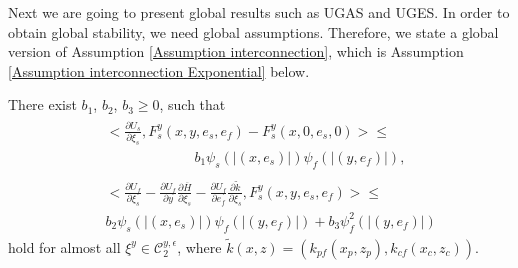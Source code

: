 Next we are going to present global results such as UGAS and UGES. 
In order to obtain global stability, we need global assumptions. Therefore, we state a global version of Assumption \ref{Assumption interconnection}, which is Assumption \ref{Assumption interconnection Exponential} below.
\begin{assum}
    There exist  $b_1$, $b_2$, $b_3 \geq 0$, such that
\begin{subequations}
    \begin{align}
        &\begin{aligned}
            &\Big < \tfrac{\partial {U_s}}{\partial \xi_s}, F_s^y(x,y,e_s,e_f) - F_s^y(x,0,e_s,0)  \Big> \leq
            \\
            &\phantom{aaaaaaaaaaaa} b_1 \psi_s\left(\left| (x, e_s) \right|\right) \psi_f\left(\left| (y, e_f) \right|\right), 
        \end{aligned}\label{eqn: SPNCS interconnection Exponential 1}
        \\
        &\begin{aligned}
            &\Big< \tfrac{\partial {U_f}}{\partial \xi_s} - \tfrac{\partial {U_f}}{\partial y} \tfrac{\partial \overline{H}}{\partial \xi_s} - \tfrac{\partial {U_f}}{\partial e_f} \tfrac{\partial \tilde k}{\partial \xi_s} ,  F_s^y(x,y,e_s,e_f) \Big> \leq
            \\
            & b_2 \psi_s\left(\left| (x, e_s) \right|\right) \psi_f\left(\left| (y, e_f) \right|\right) + b_3 \psi_f^2\left(\left| (y, e_f) \right|\right)
        \end{aligned}\label{eqn: SPNCS interconnection Exponential 2}
    \end{align}
    \label{eqn: SPNCS interconnections Exponential}%
\end{subequations}
hold for almost all $\xi^y \in \mathcal{C}_2^{y,\epsilon}$, where $\tilde k(x,z) = (k_{pf}(x_p,z_p), k_{cf}(x_c,z_c))$.
    \label{Assumption interconnection Exponential}
\end{assum}
















